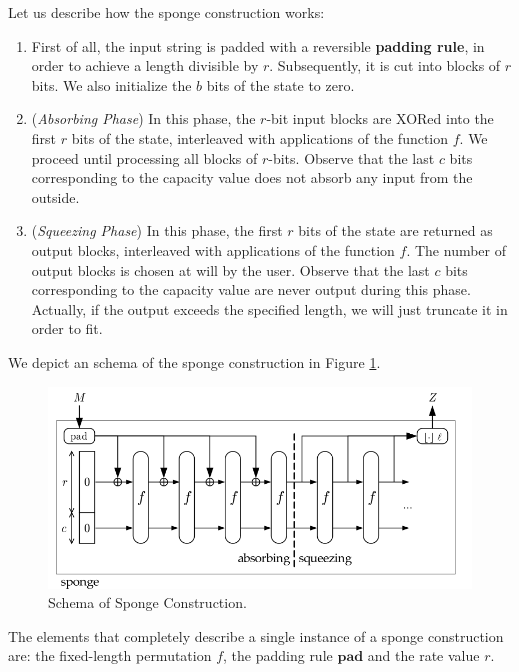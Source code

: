 Let us describe how the sponge construction works:

\begin{enumerate}
    
    \item First of all, the input string is padded with a reversible \textbf{padding rule}, in order to achieve a length divisible by $r$. Subsequently, it is cut into blocks of $r$ bits. We also initialize the $b$ bits of the state to zero. 
    
    \item (\textit{Absorbing Phase}) In this phase, the $r$-bit input blocks are XORed into the first $r$ bits of the state, interleaved with applications of the function $f$. We proceed until processing all blocks of $r$-bits. Observe that the last $c$ bits corresponding to the capacity value does not absorb any input from the outside. 
    
    \item (\textit{Squeezing Phase}) In this phase, the first $r$ bits of the state are returned as output blocks, interleaved with applications of the function $f$. The number of output blocks is chosen at will by the user. Observe that the last $c$ bits corresponding to the capacity value are never output during this phase. Actually, if the output exceeds the specified length, we will just truncate it in order to fit. 
    
\end{enumerate}

We depict an schema of the sponge construction in Figure \ref{fig:sponge-construction}. 

\begin{figure}[H]
    \centering
    \includegraphics[width=0.6\columnwidth]{../figures/sponge-construction}
    \caption{Schema of Sponge Construction.}
    \label{fig:sponge-construction}
\end{figure}

The elements that completely describe a single instance of a sponge construction are: the fixed-length permutation $f$, the padding rule $\mathbf{pad}$ and the rate value $r$. 

